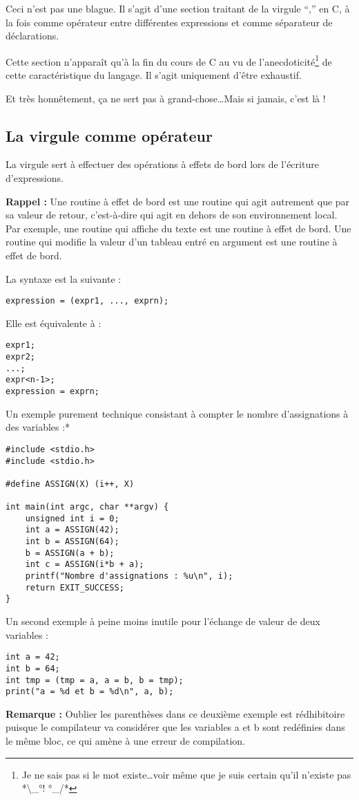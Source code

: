 \documentclass[../../../main.tex]{subfiles}
\begin{document}
Ceci n’est pas une blague. Il s’agit d’une section traitant de la virgule ``,'' en C, à la fois comme
opérateur entre différentes expressions et comme séparateur de déclarations.

Cette section n’apparaît qu’à la fin du cours de C au vu de l’anecdoticité\footnote{Je ne sais pas si le mot existe\dots voir même que je suis certain qu'il n'existe pas *\textbackslash{}\_°! °\_/*} de cette caractéristique du
langage. Il s’agit uniquement d’être exhaustif.

Et très honnêtement, ça ne sert pas à grand-chose\dots Mais si jamais, c’est là !
\subsection{La virgule comme opérateur}
La virgule sert à effectuer des opérations à effets de bord lors de l’écriture d’expressions.

\textbf{Rappel :} Une routine à effet de bord est une routine qui agit autrement que par sa valeur de retour,
c’est-à-dire qui agit en dehors de son environnement local. Par exemple, une routine qui affiche du
texte est une routine à effet de bord. Une routine qui modifie la valeur d’un tableau entré en argument
est une routine à effet de bord.

La syntaxe est la suivante :
\begin{verbatim}
expression = (expr1, ..., exprn);
\end{verbatim}
Elle est équivalente à :
\begin{verbatim}
expr1;
expr2;
...;
expr<n-1>;
expression = exprn;
\end{verbatim}
Un exemple purement technique consistant à compter le nombre d’assignations à des variables :*
\begin{verbatim}
#include <stdio.h>
#include <stdio.h>

#define ASSIGN(X) (i++, X)

int main(int argc, char **argv) {
	unsigned int i = 0;
	int a = ASSIGN(42);
	int b = ASSIGN(64);
	b = ASSIGN(a + b);
	int c = ASSIGN(i*b + a);
	printf("Nombre d'assignations : %u\n", i);
	return EXIT_SUCCESS;
}
\end{verbatim}
Un second exemple à peine moins inutile pour l’échange de valeur de deux variables :
\begin{verbatim}
int a = 42;
int b = 64;
int tmp = (tmp = a, a = b, b = tmp);
print("a = %d et b = %d\n", a, b);
\end{verbatim}
\textbf{Remarque :} Oublier les parenthèses dans ce deuxième exemple est rédhibitoire puisque le compilateur
va considérer que les variables a et b sont redéfinies dans le même bloc, ce qui amène à une erreur de
compilation.
\end{document}
